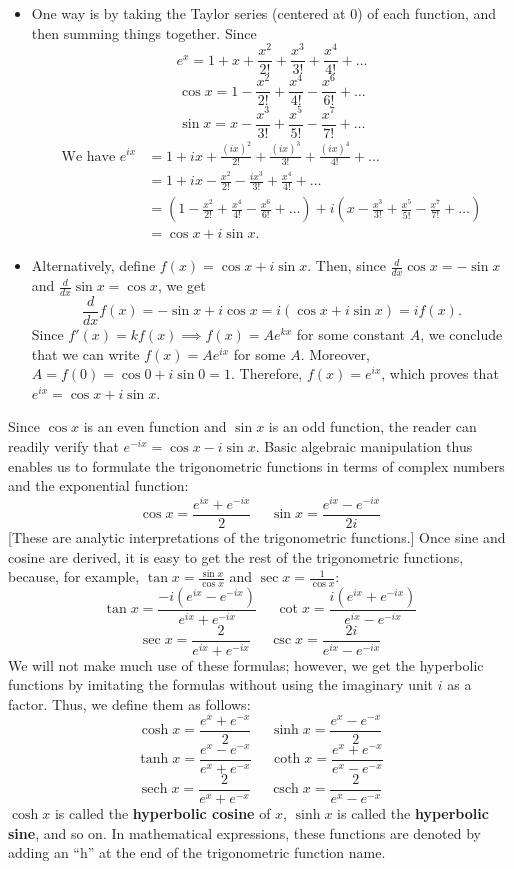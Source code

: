 \documentclass[leqno]{book}
\begin{document}
\begin{itemize}
\item One way is by taking the Taylor series (centered at $0$) of each function, and then summing things together.  Since
$$e^x=1+x+\frac{x^2}{2!}+\frac{x^3}{3!}+\frac{x^4}{4!}+\dots$$
$$\cos x=1-\frac{x^2}{2!}+\frac{x^4}{4!}-\frac{x^6}{6!}+\dots$$
$$\sin x=x-\frac{x^3}{3!}+\frac{x^5}{5!}-\frac{x^7}{7!}+\dots$$
\begin{align*}
\text{We have }e^{ix}
&=1+ix+\frac{(ix)^2}{2!}+\frac{(ix)^3}{3!}+\frac{(ix)^4}{4!}+\dots\\
&=1+ix-\frac{x^2}{2!}-\frac{ix^3}{3!}+\frac{x^4}{4!}+\dots\\
&=\left(1-\frac{x^2}{2!}+\frac{x^4}{4!}-\frac{x^6}{6!}+\dots\right)+i\left(x-\frac{x^3}{3!}+\frac{x^5}{5!}-\frac{x^7}{7!}+\dots\right)\\
&=\cos x+i\sin x.
\end{align*}
\item Alternatively, define $f(x)=\cos x+i\sin x$.  Then, since $\frac d{dx}\cos x=-\sin x$ and $\frac d{dx}\sin x=\cos x$, we get
$$\frac d{dx}f(x)=-\sin x+i\cos x=i(\cos x+i\sin x)=if(x).$$
Since $f'(x)=kf(x)\implies f(x)=Ae^{kx}$ for some constant $A$, we conclude that we can write $f(x)=Ae^{ix}$ for some $A$.  Moreover, $A=f(0)=\cos 0+i\sin 0=1$.  Therefore, $f(x)=e^{ix}$, which proves that $e^{ix}=\cos x+i\sin x$.
\end{itemize}
\noindent Since $\cos x$ is an even function and $\sin x$ is an odd function, the reader can readily verify that $e^{-ix}=\cos x-i\sin x$.  Basic algebraic manipulation thus enables us to formulate the trigonometric functions in terms of complex numbers and the exponential function:
$$\cos x=\frac{e^{ix}+e^{-ix}}2~~~~~~\sin x=\frac{e^{ix}-e^{-ix}}{2i}$$
[These are analytic interpretations of the trigonometric functions.]  Once sine and cosine are derived, it is easy to get the rest of the trigonometric functions, because, for example, $\tan x=\frac{\sin x}{\cos x}$ and $\sec x=\frac 1{\cos x}$:
$$\tan x=\frac{-i(e^{ix}-e^{-ix})}{e^{ix}+e^{-ix}}~~~~~~\cot x=\frac{i(e^{ix}+e^{-ix})}{e^{ix}-e^{-ix}}$$
$$\sec x=\frac 2{e^{ix}+e^{-ix}}~~~~~~\csc x=\frac{2i}{e^{ix}-e^{-ix}}$$
We will not make much use of these formulas; however, we get the hyperbolic functions by imitating the formulas without using the imaginary unit $i$ as a factor.  Thus, we define them as follows:
$$\cosh x=\frac{e^x+e^{-x}}2~~~~~~\sinh x=\frac{e^x-e^{-x}}2$$
$$\tanh x=\frac{e^x-e^{-x}}{e^x+e^{-x}}~~~~~~\coth x=\frac{e^x+e^{-x}}{e^x-e^{-x}}$$
$$\operatorname{sech}x=\frac 2{e^x+e^{-x}}~~~~~~\operatorname{csch}x=\frac 2{e^x-e^{-x}}$$
$\cosh x$ is called the \textbf{hyperbolic cosine} of $x$, $\sinh x$ is called the \textbf{hyperbolic sine}, and so on.  In mathematical expressions, these functions are denoted by adding an ``h'' at the end of the trigonometric function name.
\end{document}
